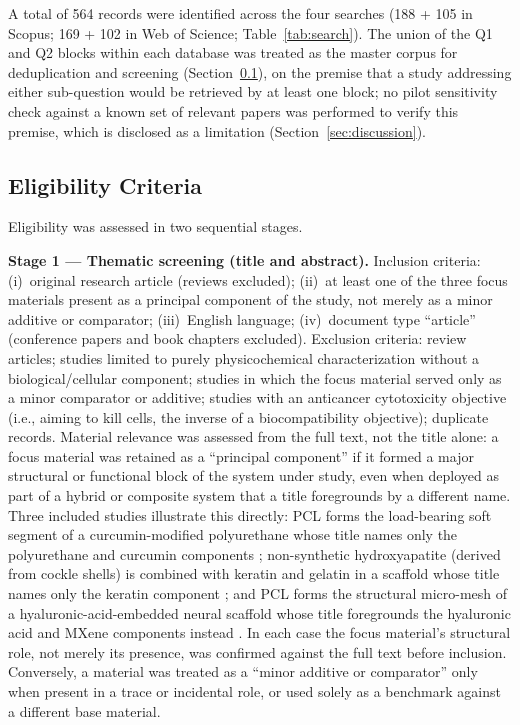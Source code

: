 \documentclass[5p,times,twocolumn]{elsarticle}
\begin{document}
A total of 564 records were identified across the four searches (188 + 105 in Scopus; 169 + 102 in Web of Science; Table~\ref{tab:search}). The union of the Q1 and Q2 blocks within each database was treated as the master corpus for deduplication and screening (Section~\ref{sec:eligibility}), on the premise that a study addressing either sub-question would be retrieved by at least one block; no pilot sensitivity check against a known set of relevant papers was performed to verify this premise, which is disclosed as a limitation (Section~\ref{sec:discussion}).

\subsection{Eligibility Criteria}
\label{sec:eligibility}

Eligibility was assessed in two sequential stages.

\textbf{Stage 1 --- Thematic screening (title and abstract).} Inclusion criteria: (i)~original research article (reviews excluded); (ii)~at least one of the three focus materials present as a principal component of the study, not merely as a minor additive or comparator; (iii)~English language; (iv)~document type ``article'' (conference papers and book chapters excluded). Exclusion criteria: review articles; studies limited to purely physicochemical characterization without a biological/cellular component; studies in which the focus material served only as a minor comparator or additive; studies with an anticancer cytotoxicity objective (i.e., aiming to kill cells, the inverse of a biocompatibility objective); duplicate records. Material relevance was assessed from the full text, not the title alone: a focus material was retained as a ``principal component'' if it formed a major structural or functional block of the system under study, even when deployed as part of a hybrid or composite system that a title foregrounds by a different name. Three included studies illustrate this directly: PCL forms the load-bearing soft segment of a curcumin-modified polyurethane whose title names only the polyurethane and curcumin components \cite{ref35}; non-synthetic hydroxyapatite (derived from cockle shells) is combined with keratin and gelatin in a scaffold whose title names only the keratin component \cite{ref40}; and PCL forms the structural micro-mesh of a hyaluronic-acid-embedded neural scaffold whose title foregrounds the hyaluronic acid and MXene components instead \cite{ref55}. In each case the focus material's structural role, not merely its presence, was confirmed against the full text before inclusion. Conversely, a material was treated as a ``minor additive or comparator'' only when present in a trace or incidental role, or used solely as a benchmark against a different base material.
\end{document}
